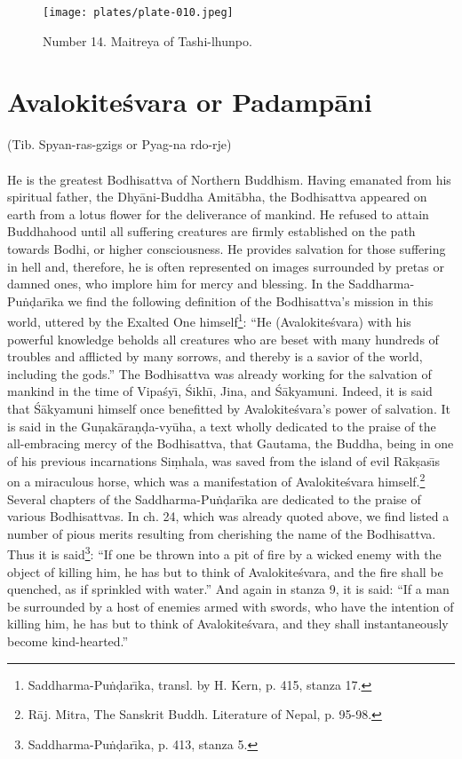 \documentclass[a4paper, 12pt, oneside]{article}
\begin{document}
\clearpage
\begin{figure}[H]
\centering
\texttt{[image: plates/plate-010.jpeg]}
\caption*{Number 14. Maitreya of Tashi-lhunpo.}
\end{figure}
\clearpage
\section{Avalokite\'{s}vara or Padamp\={a}ni}
\begin{center}
(Tib. Spyan-ras-gzigs or Pyag-na rdo-rje)
\end{center}
\paragraph{}
He is the greatest Bodhisattva of Northern Buddhism. Having emanated from his spiritual father, the Dhy\={a}ni-Buddha Amit\={a}bha, the Bodhisattva appeared on earth from a lotus flower for the deliverance of mankind. He refused to attain Buddhahood until all suffering creatures are firmly established on the path towards Bodhi, or higher consciousness. He provides salvation for those suffering in hell and, therefore, he is often represented on images surrounded by pretas or damned ones, who implore him for mercy and blessing. In the Saddharma-Pu\.{n}\d{d}ar\={\i}ka we find the following definition of the Bodhisattva's mission in this world, uttered by the Exalted One himself\footnote{Saddharma-Pu\.{n}\d{d}ar\={\i}ka, transl. by H. Kern, p. 415, stanza 17.}: ``He (Avalokite\'{s}vara) with his powerful knowledge beholds all creatures who are beset with many hundreds of troubles and afflicted by many sorrows, and thereby is a savior of the world, including the gods.'' The Bodhisattva was already working for the salvation of mankind in the time of Vipa\'{s}y\={\i}, \'{S}ikh\={\i}, Jina, and \'{S}\={a}kyamuni. Indeed, it is said that \'{S}\={a}kyamuni himself once benefitted by Avalokite\'{s}vara's power of salvation. It is said in the Gu\d{n}ak\={a}ra\d{n}\d{d}a-vy\={u}ha, a text wholly dedicated to the praise of the all-embracing mercy of the Bodhisattva, that Gautama, the Buddha, being in one of his previous incarnations Si\d{m}hala, was saved from the island of evil R\={a}k\d{s}as\={\i}s on a miraculous horse, which was a manifestation of Avalokite\'{s}vara himself.\footnote{R\={a}j. Mitra, The Sanskrit Buddh. Literature of Nepal, p. 95-98.} Several chapters of the Saddharma-Pu\.{n}\d{d}ar\={\i}ka are dedicated to the praise of various Bodhisattvas. In ch. 24, which was already quoted above, we find listed a number of pious merits resulting from cherishing the name of the Bodhisattva. Thus it is said\footnote{Saddharma-Pu\.{n}\d{d}ar\={\i}ka, p. 413, stanza 5.}: ``If one be thrown into a pit of fire by a wicked enemy with the object of killing him, he has but to think of Avalokite\'{s}vara, and the fire shall be quenched, as if sprinkled with water.'' And again in stanza 9, it is said: ``If a man be surrounded by a host of enemies armed with swords, who have the intention of killing him, he has but to think of Avalokite\'{s}vara, and they shall instantaneously become kind-hearted.''
\end{document}
